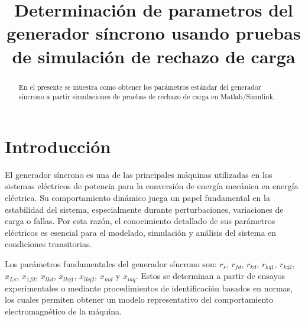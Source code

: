 \documentclass[conference]{IEEEtran}
\begin{document}
\title{Determinación de parametros del generador síncrono usando pruebas de simulación de rechazo de carga}


\author{
}


\maketitle

\thispagestyle{firststyle}
\renewcommand{\headrulewidth}{0in}
\pagestyle{empty}

\pagestyle{fancy}
\chead{\fontsize{8}{10} \selectfont \textit{} }

\begin{abstract}
	En el presente se muestra como obtener los parámetros estándar del generador síncrono a partir simulaciones de pruebas de rechazo de carga en Matlab/Simulink.
\end{abstract}

\section{Introducción}
El generador síncrono es una de las principales máquinas utilizadas en los sistemas eléctricos de potencia para la conversión de energía mecánica en energía eléctrica. Su comportamiento dinámico juega un papel fundamental en la estabilidad del sistema, especialmente durante perturbaciones, variaciones de carga o fallas. Por esta razón, el conocimiento detallado de sus parámetros eléctricos es esencial para el modelado, simulación y análisis del sistema en condiciones transitorias.

Los parámetros fundamentales del generador síncrono son: $r_s$, $r_{fd}$, $r_{kd}$, $r_{kq1}$, $r_{kq2}$, $x_{Ls}$, $x_{1fd}$, $x_{lkd}$, $x_{lkq1}$, $x_{lkq2}$, $x_{md}$ y $x_{mq}$. Estos se determinan a partir de ensayos experimentales o mediante procedimientos de identificación basados en normas, los cuales permiten obtener un modelo representativo del comportamiento electromagnético de la máquina.
\end{document}
